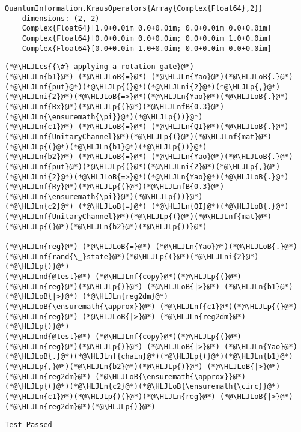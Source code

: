 \documentclass[11pt,a4paper]{article}
\newcommand{\HLJLn}[1]{#1}
\newcommand{\HLJLnd}[1]{\textcolor[RGB]{214,102,97}{#1}}
\newcommand{\HLJLnf}[1]{\textcolor[RGB]{66,102,213}{#1}}
\newcommand{\HLJLnfB}[1]{\textcolor[RGB]{59,151,46}{#1}}
\newcommand{\HLJLni}[1]{\textcolor[RGB]{59,151,46}{#1}}
\newcommand{\HLJLoB}[1]{\textcolor[RGB]{102,102,102}{\textbf{#1}}}
\newcommand{\HLJLp}[1]{#1}
\newcommand{\HLJLcs}[1]{\textcolor[RGB]{153,153,119}{\textit{#1}}}
\begin{document}
\begin{lstlisting}
QuantumInformation.KrausOperators{Array{Complex{Float64},2}}
    dimensions: (2, 2)
    Complex{Float64}[1.0+0.0im 0.0+0.0im; 0.0+0.0im 0.0+0.0im]
    Complex{Float64}[0.0+0.0im 0.0+0.0im; 0.0+0.0im 1.0+0.0im]
    Complex{Float64}[0.0+0.0im 1.0+0.0im; 0.0+0.0im 0.0+0.0im]
\end{lstlisting}


\begin{lstlisting}
(*@\HLJLcs{{\#} applying a rotation gate}@*)
(*@\HLJLn{b1}@*) (*@\HLJLoB{=}@*) (*@\HLJLn{Yao}@*)(*@\HLJLoB{.}@*)(*@\HLJLnf{put}@*)(*@\HLJLp{(}@*)(*@\HLJLni{2}@*)(*@\HLJLp{,}@*)(*@\HLJLni{2}@*)(*@\HLJLoB{=>}@*)(*@\HLJLn{Yao}@*)(*@\HLJLoB{.}@*)(*@\HLJLnf{Rx}@*)(*@\HLJLp{(}@*)(*@\HLJLnfB{0.3}@*)(*@\HLJLn{\ensuremath{\pi}}@*)(*@\HLJLp{))}@*)
(*@\HLJLn{c1}@*) (*@\HLJLoB{=}@*) (*@\HLJLn{QI}@*)(*@\HLJLoB{.}@*)(*@\HLJLnf{UnitaryChannel}@*)(*@\HLJLp{(}@*)(*@\HLJLnf{mat}@*)(*@\HLJLp{(}@*)(*@\HLJLn{b1}@*)(*@\HLJLp{))}@*)
(*@\HLJLn{b2}@*) (*@\HLJLoB{=}@*) (*@\HLJLn{Yao}@*)(*@\HLJLoB{.}@*)(*@\HLJLnf{put}@*)(*@\HLJLp{(}@*)(*@\HLJLni{2}@*)(*@\HLJLp{,}@*)(*@\HLJLni{2}@*)(*@\HLJLoB{=>}@*)(*@\HLJLn{Yao}@*)(*@\HLJLoB{.}@*)(*@\HLJLnf{Ry}@*)(*@\HLJLp{(}@*)(*@\HLJLnfB{0.3}@*)(*@\HLJLn{\ensuremath{\pi}}@*)(*@\HLJLp{))}@*)
(*@\HLJLn{c2}@*) (*@\HLJLoB{=}@*) (*@\HLJLn{QI}@*)(*@\HLJLoB{.}@*)(*@\HLJLnf{UnitaryChannel}@*)(*@\HLJLp{(}@*)(*@\HLJLnf{mat}@*)(*@\HLJLp{(}@*)(*@\HLJLn{b2}@*)(*@\HLJLp{))}@*)

(*@\HLJLn{reg}@*) (*@\HLJLoB{=}@*) (*@\HLJLn{Yao}@*)(*@\HLJLoB{.}@*)(*@\HLJLnf{rand{\_}state}@*)(*@\HLJLp{(}@*)(*@\HLJLni{2}@*)(*@\HLJLp{)}@*)
(*@\HLJLnd{@test}@*) (*@\HLJLnf{copy}@*)(*@\HLJLp{(}@*)(*@\HLJLn{reg}@*)(*@\HLJLp{)}@*) (*@\HLJLoB{|>}@*) (*@\HLJLn{b1}@*) (*@\HLJLoB{|>}@*) (*@\HLJLn{reg2dm}@*) (*@\HLJLoB{\ensuremath{\approx}}@*) (*@\HLJLnf{c1}@*)(*@\HLJLp{(}@*)(*@\HLJLn{reg}@*) (*@\HLJLoB{|>}@*) (*@\HLJLn{reg2dm}@*)(*@\HLJLp{)}@*)
(*@\HLJLnd{@test}@*) (*@\HLJLnf{copy}@*)(*@\HLJLp{(}@*)(*@\HLJLn{reg}@*)(*@\HLJLp{)}@*) (*@\HLJLoB{|>}@*) (*@\HLJLn{Yao}@*)(*@\HLJLoB{.}@*)(*@\HLJLnf{chain}@*)(*@\HLJLp{(}@*)(*@\HLJLn{b1}@*)(*@\HLJLp{,}@*)(*@\HLJLn{b2}@*)(*@\HLJLp{)}@*) (*@\HLJLoB{|>}@*) (*@\HLJLn{reg2dm}@*) (*@\HLJLoB{\ensuremath{\approx}}@*) (*@\HLJLp{(}@*)(*@\HLJLn{c2}@*)(*@\HLJLoB{\ensuremath{\circ}}@*)(*@\HLJLn{c1}@*)(*@\HLJLp{)(}@*)(*@\HLJLn{reg}@*) (*@\HLJLoB{|>}@*) (*@\HLJLn{reg2dm}@*)(*@\HLJLp{)}@*)
\end{lstlisting}

\begin{lstlisting}
Test Passed
\end{lstlisting}
\end{document}
